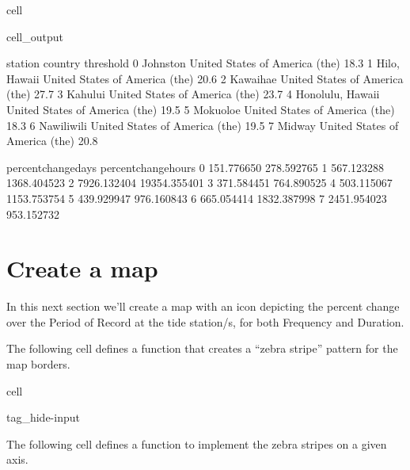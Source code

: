 \documentclass[letterpaper,10pt,english]{jupyterBook}
\begin{document}
\begin{sphinxuseclass}{cell}
\begin{sphinxVerbatimOutput}
\begin{sphinxuseclass}{cell_output}
\begin{sphinxVerbatim}[commandchars=\\\{\}]
            station                         country  threshold  \PYGZbs{}
0          Johnston  United States of America (the)       18.3   
1      Hilo, Hawaii  United States of America (the)       20.6   
2          Kawaihae  United States of America (the)       27.7   
3           Kahului  United States of America (the)       23.7   
4  Honolulu, Hawaii  United States of America (the)       19.5   
5          Mokuoloe  United States of America (the)       18.3   
6        Nawiliwili  United States of America (the)       19.5   
7            Midway  United States of America (the)       20.8   

   percent\PYGZus{}change\PYGZus{}days  percent\PYGZus{}change\PYGZus{}hours  
0           151.776650            278.592765  
1           567.123288           1368.404523  
2          7926.132404          19354.355401  
3           371.584451            764.890525  
4           503.115067           1153.753754  
5           439.929947            976.160843  
6           665.054414           1832.387998  
7          2451.954023            953.152732  
\end{sphinxVerbatim}

\end{sphinxuseclass}\end{sphinxVerbatimOutput}

\end{sphinxuseclass}

\chapter{Create a map}
\label{\detokenize{notebooks/FloodFrequency:create-a-map}}
\sphinxAtStartPar
In this next section we’ll create a map with an icon depicting the percent change over the Period of Record at the tide station/s, for both Frequency and Duration.

\sphinxAtStartPar
The following cell defines a function that creates a “zebra stripe” pattern for the map borders.

\begin{sphinxuseclass}{cell}
\begin{sphinxuseclass}{tag_hide-input}
\end{sphinxuseclass}
\end{sphinxuseclass}
\sphinxAtStartPar
The following cell defines a function to implement the zebra stripes on a given axis.
\end{document}
